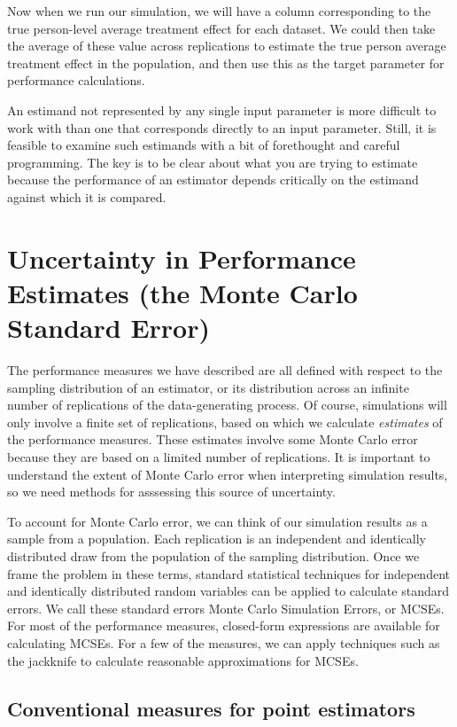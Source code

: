 \documentclass[
]{book}
\begin{document}
Now when we run our simulation, we will have a column corresponding to the true person-level average treatment effect for each dataset.
We could then take the average of these value across replications to estimate the true person average treatment effect in the population, and then use this as the target parameter for performance calculations.

An estimand not represented by any single input parameter is more difficult to work with than one that corresponds directly to an input parameter.
Still, it is feasible to examine such estimands with a bit of forethought and careful programming.
The key is to be clear about what you are trying to estimate because the performance of an estimator depends critically on the estimand against which it is compared.

\section{Uncertainty in Performance Estimates (the Monte Carlo Standard Error)}\label{MCSE}

The performance measures we have described are all defined with respect to the sampling distribution of an estimator, or its distribution across an infinite number of replications of the data-generating process.
Of course, simulations will only involve a finite set of replications, based on which we calculate \emph{estimates} of the performance measures.
These estimates involve some Monte Carlo error because they are based on a limited number of replications.
It is important to understand the extent of Monte Carlo error when interpreting simulation results, so we need methods for asssessing this source of uncertainty.

To account for Monte Carlo error, we can think of our simulation results as a sample from a population.
Each replication is an independent and identically distributed draw from the population of the sampling distribution.
Once we frame the problem in these terms, standard statistical techniques for independent and identically distributed random variables can be applied to calculate standard errors.
We call these standard errors Monte Carlo Simulation Errors, or MCSEs.
For most of the performance measures, closed-form expressions are available for calculating MCSEs.
For a few of the measures, we can apply techniques such as the jackknife to calculate reasonable approximations for MCSEs.

\subsection{Conventional measures for point estimators}\label{conventional-measures-for-point-estimators}
\end{document}
